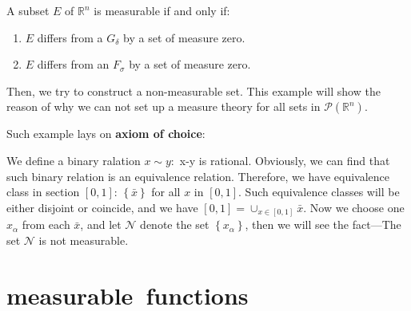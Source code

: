 \documentclass{ctexbook}
\begin{document}
\begin{cor}
    A subset $E$ of $\mathbb{R}^n $ is measurable if and only if:
    \begin{enumerate}
        \item $E$ differs from a $G_{\delta}$ by a set of measure zero.
        \item $E$ differs from an $F_{\sigma}$ by a set of measure zero.
    \end{enumerate}  
\end{cor}

Then, we try to construct a non-measurable set. This example will show the reason of why we can not set up a measure theory
for all sets in $\mathscr{P}(\mathbb{R}^n)$.

Such example lays on \textbf{axiom of choice}:
\begin{fact}
    We define a binary ralation $x\sim y:$ x-y is rational. Obviously, we can find that such binary relation is an equivalence
    relation. Therefore, we have equivalence class in section $[0,1]$: $\left\{\bar{x}\right\} $ for all $x$ in $[0,1]$. Such
    equivalence classes will be either disjoint or coincide, and we have $[0,1]=\cup_{x \in [0,1]}\bar{x}$. Now we
    choose one $x_\alpha$ from each $\bar{x}$, and let $\mathscr{N}$ denote the set $\left\{x_\alpha\right\}$, then we will see
    the fact---The set $\mathscr{N}$ is not measurable.
\end{fact}

\section{measurable~functions}
\end{document}
